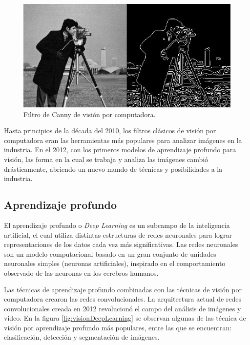 \begin{figure}[ht]
	\centering
	\includegraphics[scale=.55]{./Figures/visionComputadora.jpg}
	\caption{Filtro de Canny de visión por computadora\protect\footnotemark.}
	\label{fig:visionComputadora}
\end{figure}




Hasta principios de la década del 2010, los filtros clásicos de visión por computadora eran las herramientas más populares para analizar imágenes en la industria. En el 2012, con los primeros modelos de aprendizaje profundo para visión, las forma en la cual se trabaja y analiza las imágenes cambió drásticamente, abriendo un nuevo mundo de técnicas y posibilidades a la industria.

\newpage

\subsection{Aprendizaje profundo}

El aprendizaje profundo o \textit{Deep Learning} \citep{DEEP_LEARNING} es un subcampo de la inteligencia artificial, el cual utiliza distintas estructuras de redes neuronales para lograr representaciones de los datos cada vez más significativas. Las redes neuronales son un modelo computacional basado en un gran conjunto de unidades neuronales simples (neuronas artificiales), inspirado en el comportamiento observado de las neuronas en los cerebros humanos. 

Las técnicas de aprendizaje profundo combinadas con las técnicas de visión por computadora crearon las redes convolucionales. La arquitectura actual de redes convolucionales creada en 2012 revolucionó el campo del análisis de imágenes y video. En la figura \ref{fig:visionDeepLearning} se observan algunas de las técnica de visión por aprendizaje profundo más populares, entre las que se encuentran: clasificación, detección y segmentación de imágenes.

